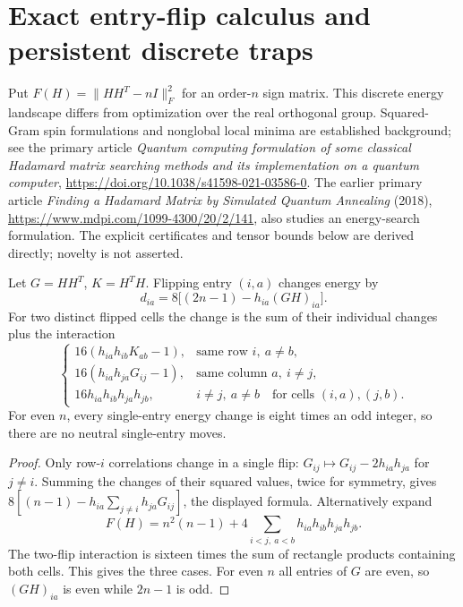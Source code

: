 \section{Exact entry-flip calculus and persistent discrete traps}
\label{sec:spectral-flip-traps}
Put $F(H)=\|HH^T-nI\|_F^2$ for an order-$n$ sign matrix.
This discrete energy landscape differs from optimization over the real
orthogonal group. Squared-Gram spin formulations and nonglobal local
minima are established background; see the primary article
\emph{Quantum computing formulation of some classical Hadamard matrix
searching methods and its implementation on a quantum computer},
\url{https://doi.org/10.1038/s41598-021-03586-0}.
The earlier primary article \emph{Finding a Hadamard Matrix by Simulated
Quantum Annealing} (2018), \url{https://www.mdpi.com/1099-4300/20/2/141},
also studies an energy-search formulation.
The explicit certificates and tensor bounds below are derived directly;
novelty is not asserted.

\begin{lemma}\label{lem:spectral-flip-calculus}
Let $G=HH^T$, $K=H^TH$. Flipping entry $(i,a)$ changes energy by
\[
 d_{ia}=8\big[(2n-1)-h_{ia}(GH)_{ia}\big].
\]
For two distinct flipped cells the change is the sum of their individual
changes plus the interaction
\[
 \begin{cases}
 16(h_{ia}h_{ib}K_{ab}-1),&\text{same row }i,\ a\ne b,\\
 16(h_{ia}h_{ja}G_{ij}-1),&\text{same column }a,\ i\ne j,\\
 16h_{ia}h_{ib}h_{ja}h_{jb},&i\ne j,\ a\ne b
 \quad\text{for cells }(i,a),(j,b).
 \end{cases}
\]
For even $n$, every single-entry energy change is eight times an odd
integer, so there are no neutral single-entry moves.
\end{lemma}
\begin{proof}
Only row-$i$ correlations change in a single flip:
$G_{ij}\mapsto G_{ij}-2h_{ia}h_{ja}$ for $j\ne i$.
Summing the changes of their squared values, twice for symmetry, gives
$8[(n-1)-h_{ia}\sum_{j\ne i}h_{ja}G_{ij}]$, the displayed formula.
Alternatively expand
\[
 F(H)=n^2(n-1)+4\sum_{i<j,\ a<b}h_{ia}h_{ib}h_{ja}h_{jb}.
\]
The two-flip interaction is sixteen times the sum of rectangle products
containing both cells. This gives the three cases. For even $n$ all
entries of $G$ are even, so $(GH)_{ia}$ is even while $2n-1$ is odd.
\end{proof}


